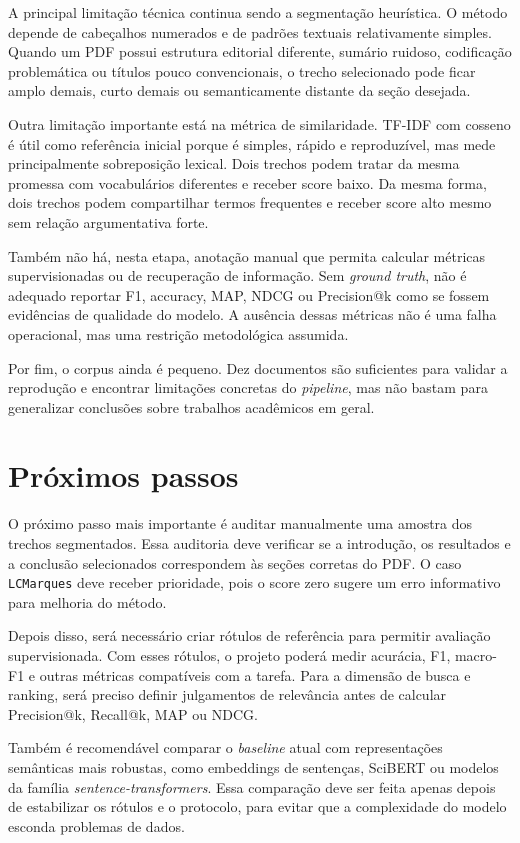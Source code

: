 \documentclass[12pt]{article}
\begin{document}
A principal limitação técnica continua sendo a segmentação heurística. O método depende de cabeçalhos numerados e de padrões textuais relativamente simples. Quando um PDF possui estrutura editorial diferente, sumário ruidoso, codificação problemática ou títulos pouco convencionais, o trecho selecionado pode ficar amplo demais, curto demais ou semanticamente distante da seção desejada.

Outra limitação importante está na métrica de similaridade. TF-IDF com cosseno é útil como referência inicial porque é simples, rápido e reproduzível, mas mede principalmente sobreposição lexical. Dois trechos podem tratar da mesma promessa com vocabulários diferentes e receber score baixo. Da mesma forma, dois trechos podem compartilhar termos frequentes e receber score alto mesmo sem relação argumentativa forte.

Também não há, nesta etapa, anotação manual que permita calcular métricas supervisionadas ou de recuperação de informação. Sem \textit{ground truth}, não é adequado reportar F1, accuracy, MAP, NDCG ou Precision@k como se fossem evidências de qualidade do modelo. A ausência dessas métricas não é uma falha operacional, mas uma restrição metodológica assumida.

Por fim, o corpus ainda é pequeno. Dez documentos são suficientes para validar a reprodução e encontrar limitações concretas do \textit{pipeline}, mas não bastam para generalizar conclusões sobre trabalhos acadêmicos em geral.

\section{Próximos passos}

O próximo passo mais importante é auditar manualmente uma amostra dos trechos segmentados. Essa auditoria deve verificar se a introdução, os resultados e a conclusão selecionados correspondem às seções corretas do PDF. O caso \texttt{LCMarques} deve receber prioridade, pois o score zero sugere um erro informativo para melhoria do método.

Depois disso, será necessário criar rótulos de referência para permitir avaliação supervisionada. Com esses rótulos, o projeto poderá medir acurácia, F1, macro-F1 e outras métricas compatíveis com a tarefa. Para a dimensão de busca e ranking, será preciso definir julgamentos de relevância antes de calcular Precision@k, Recall@k, MAP ou NDCG.

Também é recomendável comparar o \textit{baseline} atual com representações semânticas mais robustas, como embeddings de sentenças, SciBERT ou modelos da família \textit{sentence-transformers}. Essa comparação deve ser feita apenas depois de estabilizar os rótulos e o protocolo, para evitar que a complexidade do modelo esconda problemas de dados.
\end{document}
